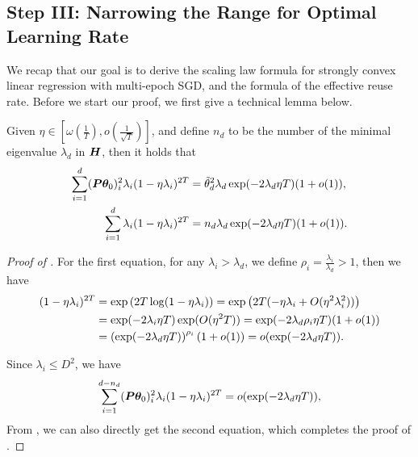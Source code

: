 \subsection{Step III: Narrowing the Range for Optimal Learning Rate}
We recap that our goal is to derive the scaling law formula for strongly convex linear regression with multi-epoch SGD, and the formula of the effective reuse rate.
Before we start our proof, we first give a technical lemma below.
\begin{lemma}\label{lem:power-exponential-approx}
    Given $\eta \in \left[\omega\left(\frac{1}{T}\right), o\left(\frac{1}{\sqrt{T}}\right)\right]$, and define $n_d$ to be the number of the minimal eigenvalue $\lambda_d$ in ${\bm{H}}$, then it holds that
    \begin{align*}
        \sum_{i=1}^d ({\bm{P}}{\bm{\theta}}_{0})_i^2 \lambda_i (1-\eta\lambda_i)^{2T} &= \Tilde{\theta}_d^2 \lambda_d \exp(-2\lambda_d\eta T)(1+o(1)),\\
        \sum_{i=1}^d \lambda_i (1-\eta\lambda_i)^{2T} & = n_d \lambda_d \exp(-2\lambda_d \eta T)(1 + o(1)).
    \end{align*}
\end{lemma}
\begin{proof}[Proof of ]
    For the first equation, for any $\lambda_i > \lambda_d$, we define $\rho_i = \frac{\lambda_i}{\lambda_d}>1$, then we have
    \begin{align}
        (1-\eta\lambda_i)^{2T} &= \exp\left(2T \log (1-\eta\lambda_i)\right)=\exp\left(2T(-\eta\lambda_i + O(\eta^2 \lambda_i^2))\right)\notag\\
        &=\exp(-2\lambda_i\eta T)\exp(O(\eta^2T))=\exp(-2\lambda_d \rho_i\eta T)(1 + o(1))\notag\\
        &=\left(\exp(-2\lambda_d\eta T)\right)^{\rho_i}(1 + o(1)) = o(\exp(-2\lambda_d\eta T)). \label{equ:power-exponential-approx}
    \end{align}
    
    Since $\lambda_i \le D^2$, we have 
    \begin{align*}
        \sum_{i=1}^{d-n_d} ({\bm{P}}{\bm{\theta}}_{0})_i^2 \lambda_i (1-\eta\lambda_i)^{2T} = o(\exp(-2\lambda_d\eta T)),
    \end{align*}
    From , we can also directly get the second equation, which completes the proof of .
\end{proof}
